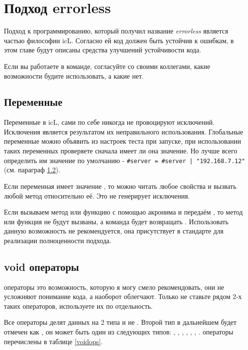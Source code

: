 
\section{Подход errorless}

\label{errorless-sec}

Подход к программированию, который получил название \textit{errorless} является частью философии icL. Согласно ей код должен быть устойчив к ошибкам, в этом главе будут описаны средства улучшений устойчивости кода.

Если вы работаете в команде, согласуйте со своими коллегами, какие возможности будите использовать, а какие нет.

\subsection{Переменные}

Переменные в icL, сами по себе никогда не провоцируют исключений. Исключения является результатом их неправильного использования. Глобальные переменные можно объявить из настроек теста при запуске, при использовании таких переменных проверяете сначала имеет ли она значение. Но лучше всего определить им значение по умолчанию - \lstinline`#server = #server | "192.168.7.12"` (см. параграф \ref{void-operators}).

Если переменная имеет значение \void, то можно читать любое свойства и вызвать любой метод относительно её. Это не генерирует исключения.

Если вызываем метод или функцию с помощью акронима и передаём \void, то метод или функция не будут вызваны, а команда будет возвращать \void. Использовать данную возможность не рекомендуется, она присутствует в стандарте для реализации полноценности подхода.

\subsection{{\color{lightblue}void} операторы}

\label{void-operators}

\void{} операторы это возможность, которую я могу смело рекомендовать, они не усложняют понимание кода, а наоборот облегчают. Только не ставьте рядом 2-х таких операторов, используете их по отдельность.

Все \void{} операторы делят данных на 2 типа \void{} и не \void{}. Второй тип в дальнейшем будет отмечен как , он может быть один из следующих типов: \integer{}, \double{}, \str{}, \listtype{}, \object{}, \set{}, \element{}. \void{} операторы перечислены в таблице \ref{voidops}.

